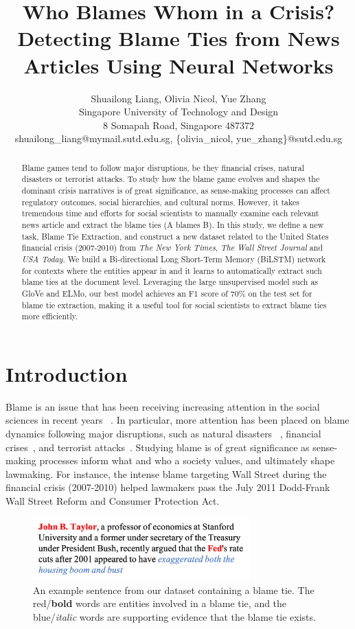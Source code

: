 \documentclass[letterpaper]{article} %
\title{Who Blames Whom in a Crisis? Detecting Blame Ties from News Articles Using Neural Networks}
\author{Shuailong Liang, Olivia Nicol, Yue Zhang\\
		Singapore University of Technology and Design \\
        8 Somapah Road, Singapore 487372\\
		shuailong\_liang@mymail.sutd.edu.sg,
		\{olivia\_nicol, yue\_zhang\}@sutd.edu.sg
}
\begin{document}
\maketitle

\begin{abstract}
Blame games tend to follow major disruptions, be they financial crises, natural disasters or terrorist attacks. To study how the blame game evolves and shapes the dominant crisis narratives is of great significance, as sense-making processes can affect regulatory outcomes, social hierarchies, and cultural norms. However, it takes tremendous time and efforts for social scientists to manually examine each relevant news article and extract the blame ties (A blames B). In this study, we define a new task, Blame Tie Extraction, and construct a new dataset related to the United States financial crisis (2007-2010) from {\it The New York Times}, {\it The Wall Street Journal} and {\it USA Today}. We build a Bi-directional Long Short-Term Memory (BiLSTM) network for contexts where the entities appear in and it learns to automatically extract such blame ties at the document level. Leveraging the large unsupervised model such as GloVe and ELMo, our best model achieves an F1 score of 70\% on the test set for blame tie extraction, making it a useful tool for social scientists to extract blame ties more efficiently.
\end{abstract}

\section{Introduction}

Blame is an issue that has been receiving increasing attention in the social sciences in recent years ~\cite{alicke2000culpable,hobolt2014blaming,hood2010blame,shaver2012attribution}. In particular, more attention has been placed on blame dynamics following major disruptions, such as natural disasters ~\cite{malhotra2008attributing}, financial crises~\cite{nicolno,tourish2012metaphors}, and terrorist attacks~\cite{olmeda2008reversal}. Studying blame is of great significance as sense-making processes inform what and who a society values, and ultimately shape lawmaking. For instance, the intense blame targeting Wall Street during the financial crisis (2007-2010) helped lawmakers pass the July 2011 Dodd-Frank Wall Street Reform and Consumer Protection Act.

\begin{figure}[t!]
\centering
\includegraphics[width=8.4cm]{example}
\caption{An example sentence from our dataset containing a blame tie. The red/{\bf bold} words are entities involved in a blame tie, and the blue/{\it italic} words are supporting evidence that the blame tie exists.}
\label{figure:introdemo}
\end{figure}
\end{document}
